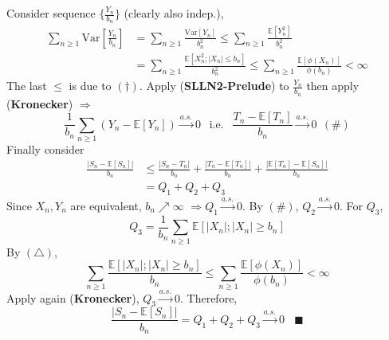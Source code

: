 \documentclass[a4paper,12pt,twoside]{book}
\begin{document}
\begin{itemize}
	Consider sequence $\{\frac{Y_n}{b_n}\}$ (clearly also indep.),
	\begin{equation}
		\begin{split}
			\sum_{n\geq 1}\mathrm{Var}\left[\frac{Y_n}{b_n}\right]&=\sum_{n\geq 1}\frac{\mathrm{Var}\left[Y_n\right]}{b_n^2}\leq \sum_{n\geq 1}\frac{\mathbb{E}\left[Y_n^2\right]}{b_n^2}\\
			&=\sum_{n\geq 1}\frac{\mathbb{E}\left[X_n^2; |X_n|\leq b_n\right]}{b_n^2}\leq \sum_{n\geq 1}\frac{\mathbb{E}\left[\phi(X_n)\right]}{\phi(b_n)}<\infty
		\end{split}
	\end{equation}
	The last $\leq$ is due to $(\dagger)$. Apply (\textbf{SLLN2-Prelude}) to $\frac{Y_n}{b_n}$ then apply (\textbf{Kronecker}) $\Rightarrow$ 
	\begin{equation}
		\frac{1}{b_n}\sum_{n\geq 1}(Y_n - \mathbb{E}\left[Y_n\right]) \xrightarrow{a.s.}0~~\text{ i.e. }~~\frac{T_n - \mathbb{E}\left[T_n\right]}{b_n} \xrightarrow{a.s.} 0~~(\#)
	\end{equation}
	Finally consider
	\begin{equation}
		\begin{split}
			\frac{|S_n- \mathbb{E}\left[S_n\right]|}{b_n}
			&\leq\frac{|S_n - T_n|}{b_n}+\frac{|T_n - \mathbb{E}\left[T_n\right]|}{b_n}+\frac{|\mathbb{E}\left[T_n\right]-\mathbb{E}\left[S_n\right]|}{b_n}\\
			&=Q_1+Q_2+Q_3
		\end{split}
	\end{equation}
	Since $X_n, Y_n$ are equivalent, $b_n \nearrow \infty$ $\Rightarrow Q_1 \xrightarrow{a.s.} 0$. \newline
	By $(\#)$, $Q_2 \xrightarrow{a.s.} 0$.\newline
	For $Q_3$,
	\begin{equation}
		Q_3 = \frac{1}{b_n}\sum_{n\geq 1}\mathbb{E}\left[|X_n|; |X_n|\geq b_n\right]
	\end{equation}
	By $(\triangle)$,
	\begin{equation}
		\sum_{n\geq 1}\frac{\mathbb{E}\left[|X_n|; |X_n|\geq b_n\right]}{b_n}\leq \sum_{n\geq 1}\frac{\mathbb{E}\left[\phi(X_n)\right]}{\phi(b_n)}<\infty
	\end{equation}
	Apply again (\textbf{Kronecker}), $Q_3 \xrightarrow{a.s.} 0$. Therefore,
	\begin{equation}
		\frac{|S_n- \mathbb{E}\left[S_n\right]|}{b_n}=Q_1+Q_2+Q_3 \xrightarrow{a.s.} 0~~~~\blacksquare
	\end{equation}
\end{itemize}
\end{document}
